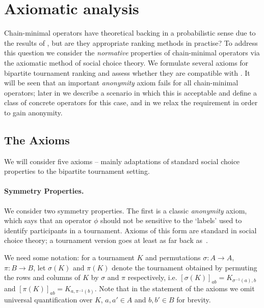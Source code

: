 \section{Axiomatic analysis}
\label{tourn_sec_axiomatic_analysis}

Chain-minimal operators have theoretical backing in a probabilistic sense due
to the results of , but are they appropriate ranking methods in
practise? To address this question we consider the \emph{normative} properties
of chain-minimal operators via the axiomatic method of social choice theory. We
formulate several axioms for bipartite tournament ranking
and assess whether they
are compatible with \chainmin{}. It will be seen that an important
\emph{anonymity} axiom fails for all chain-minimal operators; later in
 we describe a scenario in which this is
acceptable and define a class of concrete operators for this case, and in
 we relax the \chainmin{} requirement in
order to gain anonymity.

\subsection{The Axioms}

We will consider five axioms -- mainly adaptations of standard social choice
properties to the bipartite tournament setting.

\paragraph{Symmetry Properties.}
%
We consider two symmetry properties. The first is a classic \emph{anonymity}
axiom, which says that an operator $\phi$ should not be sensitive to the
`labels' used to identify participants in a tournament. Axioms of this form are
standard in social choice theory; a tournament version goes at least as far
back as~\cite{rubinstein1980ranking}.

We need some notation: for a tournament $K$ and permutations $\sigma: A \to A$,
$\pi: B \to B$, let $\sigma(K)$ and $\pi(K)$ denote the tournament obtained by
permuting the rows and columns of $K$ by $\sigma$ and $\pi$ respectively, i.e.
$[\sigma(K)]_{ab} = K_{\sigma^{-1}(a), b}$ and $[\pi(K)]_{ab} = K_{a,
\pi^{-1}(b)}$. Note that in the statement of the axioms we omit universal
quantification over $K$, $a, a' \in A$ and $b, b' \in B$ for
brevity.

